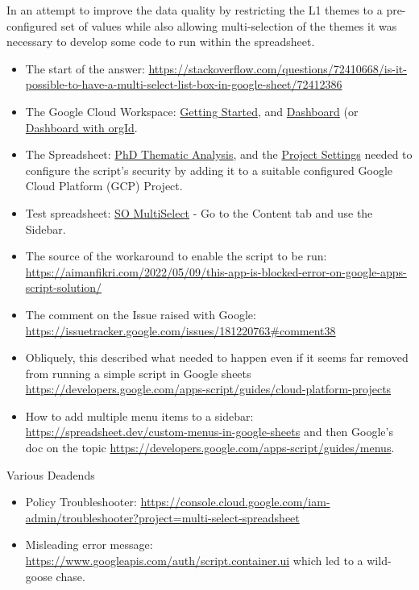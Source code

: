 In an attempt to improve the data quality by restricting the L1 themes to a pre-configured set of values while also allowing multi-selection of the themes it was necessary to develop some code to run within the spreadsheet.

\begin{itemize}
    \item The start of the answer: \url{https://stackoverflow.com/questions/72410668/is-it-possible-to-have-a-multi-select-list-box-in-google-sheet/72412386}
    \item The Google Cloud Workspace: \href{https://console.cloud.google.com/getting-started?project=multi-select-spreadsheet}{Getting Started}, and \href{https://console.cloud.google.com/home/dashboard?project=multi-select-spreadsheet}{Dashboard} (or \href{https://console.cloud.google.com/home/dashboard?organizationId=0&project=multi-select-spreadsheet}{Dashboard with orgId}.
    \item The Spreadsheet: \href{https://docs.google.com/spreadsheets/d/1AIIAPWyy8Sx7rEBOx6KlZspoaS7pRUEneQgDTgXZwWI/edit#gid=397772862}{PhD Thematic Analysis}, and the \href{https://script.google.com/home/projects/101Q5upPmS1VAt1c2pXfpWn82QYI_dUg_94XfiHN1IrXmADGg2EQ9-AFG/settings}{Project Settings} needed to configure the script's security by adding it to a suitable configured Google Cloud Platform (GCP) Project.
    \item Test spreadsheet: \href{https://docs.google.com/spreadsheets/d/100M3MkhsQr0Fj-Ly2OCnnz6nzfVS32EVBH_GD7kuvRs/edit}{SO MultiSelect} - Go to the Content tab and use the Sidebar.
    \item The source of the workaround to enable the script to be run: \url{https://aimanfikri.com/2022/05/09/this-app-is-blocked-error-on-google-apps-script-solution/}
    \item The comment on the Issue raised with Google: \url{https://issuetracker.google.com/issues/181220763\#comment38}
    \item Obliquely, this described what needed to happen even if it seems far removed from running a simple script in Google sheets \url{https://developers.google.com/apps-script/guides/cloud-platform-projects}
    \item How to add multiple menu items to a sidebar: \url{https://spreadsheet.dev/custom-menus-in-google-sheets} and then Google's doc on the topic \url{https://developers.google.com/apps-script/guides/menus}.
\end{itemize}

Various Deadends
\begin{itemize}
    \item Policy Troubleshooter: \url{https://console.cloud.google.com/iam-admin/troubleshooter?project=multi-select-spreadsheet}
    \item Misleading error message: \url{https://www.googleapis.com/auth/script.container.ui} which led to a wild-goose chase.
\end{itemize}

